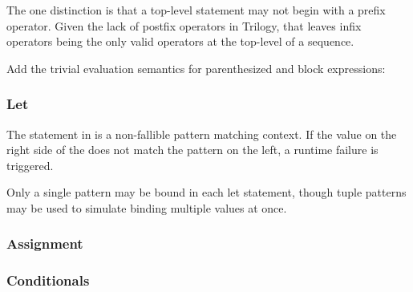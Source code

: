 The one distinction is that a top-level statement may not begin with a
prefix operator. Given the lack of postfix operators in Trilogy, that
leaves infix operators being the only valid operators at the top-level
of a sequence.

Add the trivial evaluation semantics for parenthesized and block
expressions:

\begin{figure}[H]
    \centering
    \parbox[t]{0.35\linewidth}{
        \begin{prooftree}
        \end{prooftree}
    }
    \parbox[t]{0.35\linewidth}{
        \begin{prooftree}
        \end{prooftree}
    }
\end{figure}

\subsubsection{Let}

The  statement in \Prose{} is a non-fallible pattern matching context.
If the value on the right side of the \op{=} does not match the pattern on the
left, a runtime failure is triggered.

Only a single pattern may be bound in each let statement, though tuple patterns
may be used to simulate binding multiple values at once.

\begin{bnf*}
\end{bnf*}

\subsubsection{Assignment}

\subsubsection{Conditionals}

